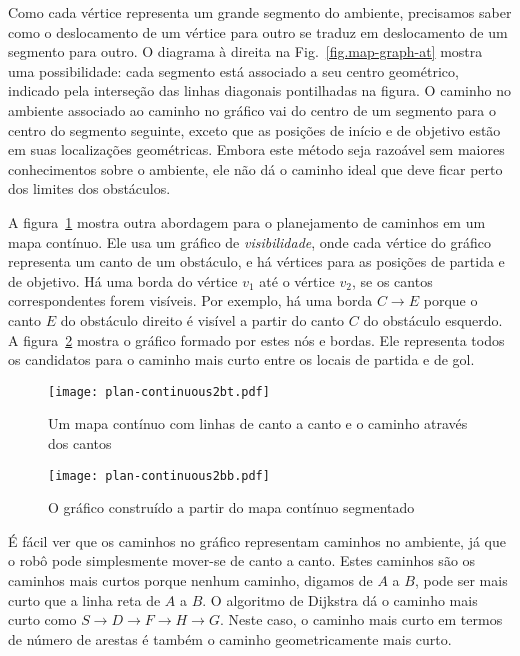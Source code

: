 Como cada vértice representa um grande segmento do ambiente, precisamos saber como o deslocamento de um vértice para outro se traduz em deslocamento de um segmento para outro. O diagrama à direita na Fig.~\ref{fig.map-graph-at} mostra uma possibilidade: cada segmento está associado a seu centro geométrico, indicado pela interseção das linhas diagonais pontilhadas na figura. O caminho no ambiente associado ao caminho no gráfico vai do centro de um segmento para o centro do segmento seguinte, exceto que as posições de início e de objetivo estão em suas localizações geométricas. Embora este método seja razoável sem maiores conhecimentos sobre o ambiente, ele não dá o caminho ideal que deve ficar perto dos limites dos obstáculos.

A figura~\ref{fig.map-graph-bt} mostra outra abordagem para o planejamento de caminhos em um mapa contínuo. Ele usa um gráfico de \emph{visibilidade}, onde cada vértice do gráfico representa um canto de um obstáculo, e há vértices para as posições de partida e de objetivo. Há uma borda do vértice $v_1$ até o vértice $v_2$, se os cantos correspondentes forem visíveis. Por exemplo, há uma borda $C\rightarrow E$ porque o canto $E$ do obstáculo direito é visível a partir do canto $C$ do obstáculo esquerdo. A figura~\ref{fig.map-graph-bb} mostra o gráfico formado por estes nós e bordas. Ele representa todos os candidatos para o caminho mais curto entre os locais de partida e de gol.

\begin{figure}
\begin{center}
\texttt{[image: plan-continuous2bt.pdf]}
\end{center}
\caption{Um mapa contínuo com linhas de canto a canto e o caminho através dos cantos}\label{fig.map-graph-bt}
\end{figure}

\begin{figure}
\begin{center}
\texttt{[image: plan-continuous2bb.pdf]}
\end{center}
\caption{O gráfico construído a partir do mapa contínuo segmentado}\label{fig.map-graph-bb}
\end{figure}

É fácil ver que os caminhos no gráfico representam caminhos no ambiente, já que o robô pode simplesmente mover-se de canto a canto. Estes caminhos são os caminhos mais curtos porque nenhum caminho, digamos de $A$ a $B$, pode ser mais curto que a linha reta de $A$ a $B$. O algoritmo de Dijkstra dá o caminho mais curto como $S\rightarrow D\rightarrow F\rightarrow H\rightarrow G$. Neste caso, o caminho mais curto em termos de número de arestas é também o caminho geometricamente mais curto.

